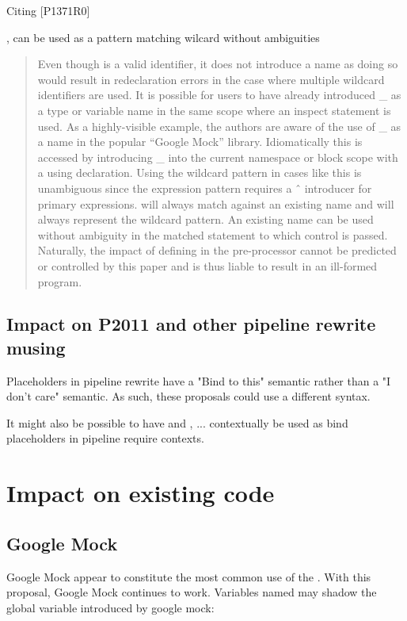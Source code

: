 \documentclass{wg21}
\begin{document}
Citing [P1371R0]{\cite{P1371R0}, \tcode{_} can be used as a pattern matching wilcard without ambiguities
    
\begin{quote}
Even though \tcode{_} is a valid identifier, it does not introduce a name as doing so would result in redeclaration
errors in the case where multiple wildcard \tcode{_} identifiers are used.
It is possible for users to have already introduced _ as a type or variable name in the same scope where an
inspect statement is used. As a highly-visible example, the authors are aware of the use of _ as a name in
the popular “Google Mock” library. Idiomatically this is accessed by introducing _ into the current namespace
or block scope with a using declaration. Using the wildcard pattern in cases like this is unambiguous since
the expression pattern requires a ˆ introducer for primary expressions. \tcode{\^_} will always match against an
existing name and \tcode{_} will always represent the wildcard pattern. An existing \tcode{_} name can be used without
ambiguity in the matched statement to which control is passed.
Naturally, the impact of defining \tcode{_} in the pre-processor cannot be predicted or controlled by this paper and
is thus liable to result in an ill-formed program.
\end{quote}

\subsection{Impact on P2011 and other pipeline rewrite musing}

Placeholders in pipeline rewrite have a "Bind to this" semantic rather than a "I don't care" semantic.
As such, these proposals could use a different syntax.

It might also be possible to have \tcode{_}  and , ... contextually be used as 
bind placeholders in pipeline require contexts.


\section{Impact on existing code}

\subsection{Google Mock}

Google Mock appear to constitute the most common use of the .
With this proposal, Google Mock continues to work.
Variables named \tcode{_} may shadow the  global variable introduced by google mock:

}
\end{document}
